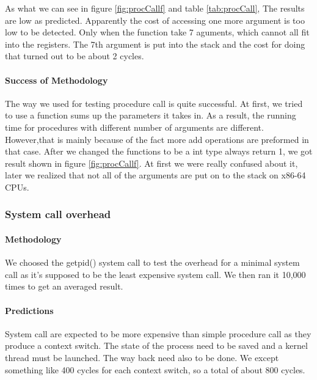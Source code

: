 As what we can see in figure \ref{fig:procCallf} and table \ref{tab:procCall}, The results are low as predicted. Apparently the cost of accessing one more argument is too low to be detected. Only when the function take 7 aguments, which cannot all fit into the registers. The 7th argument is put into the stack and the cost for doing that turned out to be about 2 cycles.

\paragraph{Success of Methodology}
The way we used for testing procedure call is quite successful. At first, we tried to use a function sums up the parameters it takes in. As a result, the running time for procedures with different number of arguments are different. However,that is mainly because of the fact more add operations are preformed in that case. After we changed the functions to be a int type always return 1, we got result shown in figure \ref{fig:procCallf}. At first we were really confused about it, later we realized that not all of the arguments are put on to the stack on x86-64 CPUs.






\subsubsection{System call overhead}
\paragraph{Methodology}
We choosed the getpid() system call to test the overhead for a minimal system
call as it's supposed to be the least expensive system call.
We then ran it 10,000 times to get an averaged result.

\paragraph{Predictions}
System call are expected to be more expensive than simple procedure call as they
produce a context switch.
The state of the process need to be saved and a kernel thread must be launched.
The way back need also to be done.
We except something like 400 cycles for each context switch, so a total of about 800 cycles.

